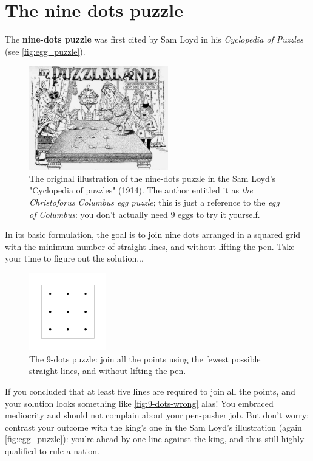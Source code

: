 \documentclass[11pt]{article}
\begin{document}
\hypertarget{nine-dots-puzzle} {
	\section{The nine dots puzzle}
	\label{nine-dots-puzzle}
}
The \textbf{nine-dots puzzle} was first cited by Sam Loyd in his \emph{Cyclopedia of Puzzles}\cite{cyclopedia-puzzle} (see \autoref{fig:egg_puzzle}).
\begin{figure}[H]
	\centering
	\includegraphics[width=0.54\textwidth]{images/egg_puzzle.jpg}
	\caption{The original illustration of the nine-dots puzzle in the Sam Loyd's "Cyclopedia of puzzles"\cite{cyclopedia-puzzle} (1914). The author entitled it as \emph{the Christoforus Columbus egg puzzle}; this is just a reference to the \emph{egg of Columbus}: you don't actually need 9 eggs to try it yourself.}
\label{fig:egg_puzzle}
\end{figure}
In its basic formulation, the goal is to join nine dots arranged in a squared grid with the minimum number of straight lines, and without lifting the pen. Take your time to figure out the solution...
\begin{figure}[H]
\centering
\includegraphics[width=0.3\textwidth]{images/9-dots-grid.png}
\caption{The 9-dots puzzle: join all the points using the fewest possible straight lines, and without lifting the pen.}
\label{fig:9-dots-grid}
\end{figure}
If you concluded that at least five lines are required to join all the points, and your solution looks something like \autoref{fig:9-dots-wrong} alas! You embraced mediocrity and should not complain about your pen-pusher job. But don't worry: contrast your outcome with the king's one in the Sam Loyd's illustration (again \autoref{fig:egg_puzzle}): you're ahead by one line against the king, and thus still highly qualified to rule a nation.
\end{document}
